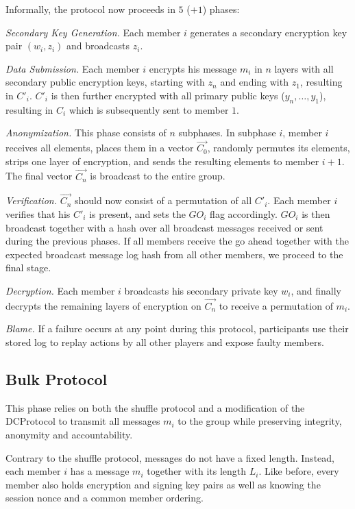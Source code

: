 Informally, the protocol now proceeds in $5$ ($ + 1$) phases:

\emph{Secondary Key Generation.}
      Each member $i$ generates a secondary encryption key pair $(w_i, z_i)$ and broadcasts $z_i$.
      
\emph{Data Submission.}
      Each member $i$ encrypts his message $m_i$ in $n$ layers with all secondary public encryption keys,
      starting with $z_n$ and ending with $z_1$, resulting in $C'_i$.  $C'_i$ is then further encrypted
      with all primary public keys ($y_n, \ldots, y_1$), resulting in $C_i$ which is subsequently
      sent to member $1$. 
      
\emph{Anonymization.}
      This phase consists of $n$ subphases. In subphase $i$, member $i$ receives all elements,
      places them in a vector $\vec{C_0}$, randomly permutes its elements, strips one layer of
      encryption, and sends the resulting elements to member $i + 1$. The final vector $\vec{C_n}$
      is broadcast to the entire group.
      
\emph{Verification.}
      $\vec{C_n}$ should now consist of a permutation of all $C'_i$. Each member $i$ verifies that
      his $C'_i$ is present, and sets the $GO_i$ flag accordingly. $GO_i$ is then broadcast
      together with a hash over all broadcast messages received or sent during the previous phases.
      If all members receive the go ahead together with the expected broadcast message log hash
      from all other members, we proceed to the final stage.
      
\emph{Decryption.}
      Each member $i$ broadcasts his secondary private key $w_i$, and finally decrypts the remaining
      layers of encryption on $\vec{C_n}$ to receive a permutation of $m_i$.
      
\emph{Blame.}
      If a failure occurs at any point during this protocol, participants use their stored
      log to replay actions by all other players and expose faulty members.

\subsection{Bulk Protocol}

This phase relies on both the shuffle protocol and a modification of the \ac{DCProtocol}
to transmit all messages $m_i$ to the group while preserving integrity, anonymity and accountability.

Contrary to the shuffle protocol, messages do not have a fixed length. Instead, each member
$i$ has a message $m_i$ together with its length $L_i$. Like before, every member also holds encryption and
signing key pairs as well as knowing the session nonce and a common member ordering.

